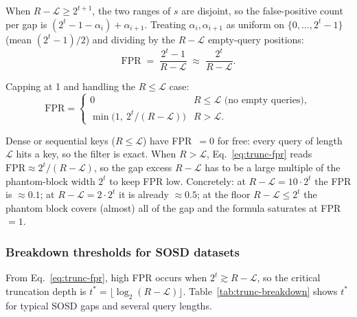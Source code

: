 When $R - \mathcal{L} \ge 2^{t+1}$, the two ranges of $s$ are disjoint, so the
false-positive count per gap is $(2^t - 1 - \alpha_i) + \alpha_{i+1}$.
Treating $\alpha_i, \alpha_{i+1}$ as uniform on $\{0, \ldots, 2^t - 1\}$ (mean $(2^t-1)/2$)
and dividing by the $R - \mathcal{L}$ empty-query positions:
\begin{equation}
    \mathrm{FPR}
    \;=\; \frac{2^t - 1}{R - \mathcal{L}}
    \;\approx\; \frac{2^t}{R - \mathcal{L}}.
    \label{eq:trunc-fpr}
\end{equation}

Capping at 1 and handling the $R \leq \mathcal{L}$ case:
\[
    \mathrm{FPR} =
    \begin{cases}
        0 & R \leq \mathcal{L} \text{ (no empty queries)}, \\
        \min\!\bigl(1,\ 2^t/(R - \mathcal{L})\bigr) & R > \mathcal{L}.
    \end{cases}
\]

Dense or sequential keys ($R \leq \mathcal{L}$) have FPR~$= 0$ for free: every query
of length $\mathcal{L}$ hits a key, so the filter is exact.
When $R > \mathcal{L}$, Eq.~\eqref{eq:trunc-fpr} reads $\mathrm{FPR} \approx 2^t / (R - \mathcal{L})$, so the gap excess $R - \mathcal{L}$ has to be a large multiple of the
phantom-block width $2^t$ to keep FPR low.
Concretely: at $R - \mathcal{L} = 10 \cdot 2^t$ the FPR is ${\approx}0.1$; at
$R - \mathcal{L} = 2 \cdot 2^t$ it is already ${\approx}0.5$; at the floor
$R - \mathcal{L} \leq 2^t$ the phantom block covers (almost) all of the gap and the
formula saturates at FPR~$=1$.

\subsubsection*{Breakdown thresholds for SOSD datasets}

From Eq.~\eqref{eq:trunc-fpr}, high FPR occurs when $2^t \gtrsim R - \mathcal{L}$,
so the critical truncation depth is $t^* = \lfloor\log_2(R - \mathcal{L})\rfloor$.
Table~\ref{tab:trunc-breakdown} shows $t^*$ for typical SOSD gaps and several query lengths.

